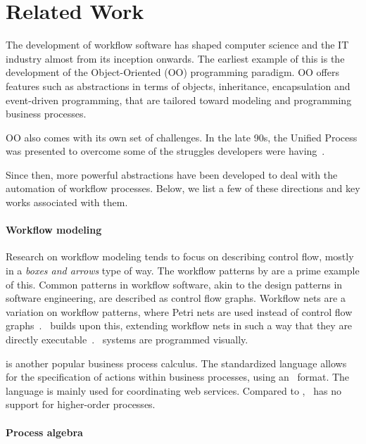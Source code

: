 
\section{Related Work}
\label{sec:relatedwork}

The development of workflow software has shaped computer science and the IT industry almost from its inception onwards.
The earliest example of this is the development of the Object-Oriented (OO) programming paradigm.
OO offers features such as abstractions in terms of objects, inheritance, encapsulation and event-driven programming, that are tailored toward modeling and programming business processes.

OO also comes with its own set of challenges.
In the late 90s, the Unified Process was presented to overcome some of the struggles developers were having~\cite{books/daglib/0000196}.

Since then, more powerful abstractions have been developed to deal with the automation of workflow processes.
Below, we list a few of these directions and key works associated with them.


\paragraph{Workflow modeling}

Research on workflow modeling tends to focus on describing control flow, mostly in a \textit{boxes and arrows} type of way.
The workflow patterns by \citet{journals/dpd/AalstHKB03} are a prime example of this.
Common patterns in workflow software, akin to the design patterns in software engineering, are described as control flow graphs.
Workflow nets are a variation on workflow patterns, where Petri nets are used instead of control flow graphs~\cite{journals/infsof/LassenA09,journals/jcsc/Aalst98}.
\YAWL\ builds upon this, extending workflow nets in such a way that they are directly executable~\cite{journals/is/AalstH05}.
\YAWL\ systems are programmed visually.

\BPEL \cite{bpel} is another popular business process calculus.
The standardized language allows for the specification of actions within business processes, using an \XML\ format.
The language is mainly used for coordinating web services.
Compared to \TOPHAT, \BPEL\ has no support for higher-order processes.


\paragraph{Process algebra}

